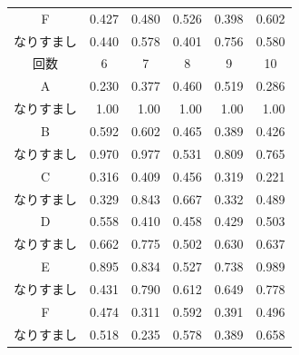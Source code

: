 \begin{table}[btph]
\begin{tabular}{|c|r|r|r|r|r|}
    F & 0.427 & 0.480 & 0.526 & 0.398 & 0.602 \\
    なりすまし & 0.440 & 0.578 & 0.401 & 0.756 & 0.580 \\ \hline \hline
    \multicolumn{1}{|c|}{回数} & \multicolumn{1}{c|}{6} & \multicolumn{1}{c|}{7} & \multicolumn{1}{c|}{8} & \multicolumn{1}{c|}{9} & \multicolumn{1}{c|}{10} \\ \hline
    A & 0.230 & 0.377 & 0.460 & 0.519 & 0.286 \\
    なりすまし & 1.00 & 1.00 & 1.00 & 1.00 & 1.00 \\ \hline
    B & 0.592 & 0.602 & 0.465 & 0.389 & 0.426 \\
    なりすまし & 0.970 & 0.977 & 0.531 & 0.809 & 0.765 \\ \hline
    C & 0.316 & 0.409 & 0.456 & 0.319 & 0.221 \\
    なりすまし & 0.329 & 0.843 & 0.667 & 0.332 & 0.489 \\ \hline
    D & 0.558 & 0.410 & 0.458 & 0.429 & 0.503 \\
    なりすまし & 0.662 & 0.775 & 0.502 & 0.630 & 0.637 \\ \hline
    E & 0.895 & 0.834 & 0.527 & 0.738 & 0.989 \\
    なりすまし & 0.431 & 0.790 & 0.612 & 0.649 & 0.778 \\ \hline
    F & 0.474 & 0.311 & 0.592 & 0.391 & 0.496 \\
    なりすまし & 0.518 & 0.235 & 0.578 & 0.389 & 0.658 \\ \hline
  \end{tabular}
\end{table}

